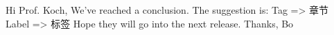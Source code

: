 Hi Prof. Koch,
We’ve reached a conclusion. The suggestion is:
Tag => 章节
Label => 标签
Hope they will go into the next release.
Thanks,
Bo